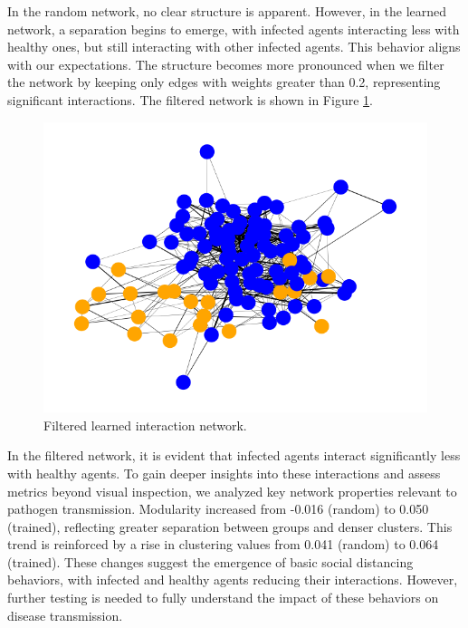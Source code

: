 \documentclass[9pt]{IEEEtran}
\begin{document}
In the random network, no clear structure is apparent. However, in the learned network, a separation begins to emerge, with infected agents interacting less with healthy ones, but still interacting with other infected agents. This behavior aligns with our expectations. The structure becomes more pronounced when we filter the network by keeping only edges with weights greater than 0.2, representing significant interactions. The filtered network is shown in Figure \ref{fig:filtered_net}.

\begin{figure}[hbt]
    \centering
    \includegraphics[width=0.9\linewidth]{filteredNet.png}
    \caption{Filtered learned interaction network.}
    \label{fig:filtered_net}
\end{figure}

In the filtered network, it is evident that infected agents interact significantly less with healthy agents. To gain deeper insights into these interactions and assess metrics beyond visual inspection, we analyzed key network properties relevant to pathogen transmission. Modularity increased from -0.016 (random) to 0.050 (trained), reflecting greater separation between groups and denser clusters. This trend is reinforced by a rise in clustering values from 0.041 (random) to 0.064 (trained). These changes suggest the emergence of basic social distancing behaviors, with infected and healthy agents reducing their interactions. However, further testing is needed to fully understand the impact of these behaviors on disease transmission.
\end{document}
